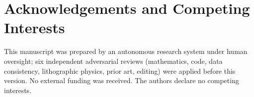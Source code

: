 \documentclass[11pt,a4paper]{article}
\theoremstyle{remark}\newtheorem*{remark}{Remark}
\begin{document}
\section*{Acknowledgements and Competing Interests}
This manuscript was prepared by an autonomous research system under human oversight; six independent adversarial reviews (mathematics, code, data consistency, lithographic physics, prior art, editing) were applied before this version. No external funding was received. The authors declare no competing interests.



\end{document}

